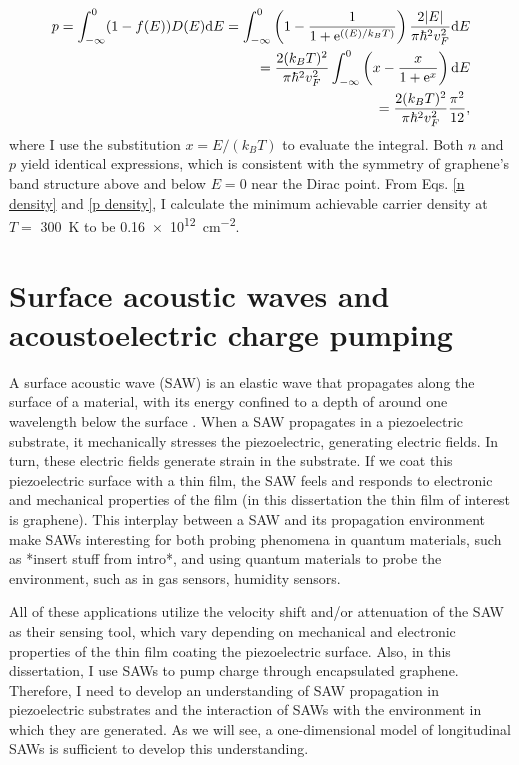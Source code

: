 \documentclass[double,12pt,1in]{beavtex}
\begin{document}
\begin{equation}
    \begin{split}
        p = \int_{-\infty}^{0}(1-f(E)) D(E)\mathrm{d}E 
        = \int_{-\infty}^{0}\left( 1 -\frac{1}{1+\mathrm{e}^{((E)/k_B T)}} \right) \frac{2\abs{E}}{\pi \hbar^2 v_F^2}\mathrm{d}E \\
        = \frac{2(k_B T)^2}{\pi \hbar^2 v_F^2}\int_{-\infty}^{0}\left(x - \frac{x}{1+\mathrm{e}^{x}}\right)\mathrm{d}E \\
        = \frac{2(k_B T)^2}{\pi\hbar^2 v_F^2} \frac{\pi^2}{12}, \label{p density}
    \end{split}
\end{equation}
where I use the substitution $x = E/(k_B T)$ to evaluate the integral. Both $n$ and $p$ yield identical expressions, which is consistent with the symmetry of graphene's band structure above and below $E = 0$ near the Dirac point. From Eqs. \ref{n density} and \ref{p density}, I calculate the minimum achievable carrier density at $T = $ \SI{300}{\kelvin} to be \SI{0.16e12}{\centi\meter^{-2}}.




\section{Surface acoustic waves and acoustoelectric charge pumping}


A surface acoustic wave (SAW) is an elastic wave that propagates along the surface of a material, with its energy confined to a depth of around one wavelength below the surface \cite{rayleigh_waves_1885}. When a SAW propagates in a piezoelectric substrate, it mechanically stresses the piezoelectric, generating electric fields. In turn, these electric fields generate strain in the substrate. If we coat this piezoelectric surface with a thin film, the SAW feels and responds to electronic and mechanical properties of the film (in this dissertation the thin film of interest is graphene). This interplay between a SAW and its propagation environment make SAWs interesting for both probing phenomena in quantum materials, such as *insert stuff from intro*, and using quantum materials to probe the environment, such as in gas sensors, humidity sensors.

All of these applications utilize the velocity shift and/or attenuation of the SAW as their sensing tool, which vary depending on mechanical and electronic properties of the thin film coating the piezoelectric surface. Also, in this dissertation, I use SAWs to pump charge through encapsulated graphene. Therefore, I need to develop an understanding of SAW propagation in piezoelectric substrates and the interaction of SAWs with the environment in which they are generated. As we will see, a one-dimensional model of longitudinal SAWs is sufficient to develop this understanding. 
\end{document}
